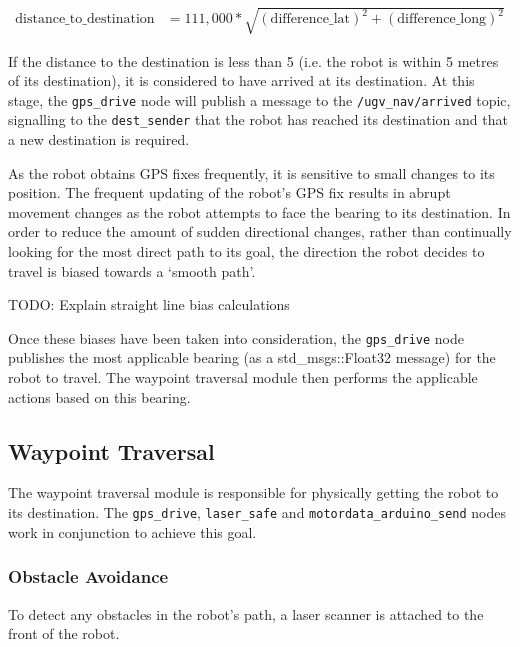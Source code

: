 \documentclass[titlepage,12pt,a4paper]{article}
\begin{document}
\pagebreak


\begin{align*}
	\text{distance\_to\_destination}	&= 	111,000 * \sqrt{(\text{difference\_lat})^2 + (\text{difference\_long})^2}
\end{align*}

If the distance to the destination is less than 5 (i.e. the robot is within 5 metres of its destination), it is considered to have arrived at its destination. At this stage, the \verb|gps_drive| node will publish a message to the \verb|/ugv_nav/arrived| topic, signalling to the \verb|dest_sender| that the robot has reached its destination and that a new destination is required.




As the robot obtains GPS fixes frequently, it is sensitive to small changes to its position. The frequent updating of the robot's GPS fix results in abrupt movement changes as the robot attempts to face the bearing to its destination. In order to reduce the amount of sudden directional changes, rather than continually looking for the most direct path to its goal, the direction the robot decides to travel is biased towards a `smooth path'.


TODO: Explain straight line bias calculations 


Once these biases have been taken into consideration, the \verb|gps_drive| node publishes the most applicable bearing (as a std\_msgs::Float32 message) for the robot to travel. The waypoint traversal module then performs the applicable actions based on this bearing.

\pagebreak

\subsection{Waypoint Traversal}
The waypoint traversal module is responsible for physically getting the robot to its destination. The \verb|gps_drive|, \verb|laser_safe| and \verb|motordata_arduino_send| nodes work in conjunction to achieve this goal.

\subsubsection{Obstacle Avoidance}
To detect any obstacles in the robot's path, a laser scanner is attached to the front of the robot.
\end{document}
